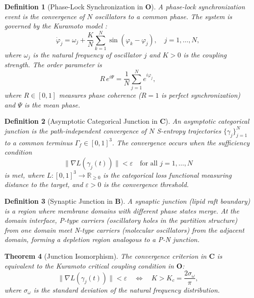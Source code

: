 \documentclass[twocolumn,10pt]{article}
\newtheorem{theorem}{Theorem}[section]
\newtheorem{definition}[theorem]{Definition}
\theoremstyle{remark}
\newcommand{\eps}{\varepsilon}
\newcommand{\CatO}{\mathbf{O}}
\newcommand{\CatC}{\mathbf{C}}
\newcommand{\CatB}{\mathbf{B}}
\begin{document}
\begin{definition}[Phase-Lock Synchronization in $\CatO$]
\label{def:junction_O}
A \emph{phase-lock synchronization event} is the convergence of $N$ oscillators to a common phase.
The system is governed by the Kuramoto model \cite{kuramoto1984,strogatz2000}:
\begin{equation}
\dot{\varphi}_j = \omega_j + \frac{K}{N}\sum_{k=1}^{N}\sin(\varphi_k - \varphi_j), \quad j = 1,\ldots,N,
\label{eq:kuramoto}
\end{equation}
where $\omega_j$ is the natural frequency of oscillator $j$ and $K > 0$ is the coupling strength.
The order parameter is
\begin{equation}
R\, e^{i\Psi} = \frac{1}{N}\sum_{j=1}^{N}e^{i\varphi_j},
\label{eq:order_param}
\end{equation}
where $R \in [0,1]$ measures phase coherence ($R = 1$ is perfect synchronization) and $\Psi$ is the mean phase.
\end{definition}

\begin{definition}[Asymptotic Categorical Junction in $\CatC$]
\label{def:junction_C}
An \emph{asymptotic categorical junction} is the path-independent convergence of $N$ S-entropy trajectories $\{\gamma_j\}_{j=1}^N$ to a common terminus $\Gamma_f \in [0,1]^3$.
The convergence occurs when the sufficiency condition
\begin{equation}
\|\nabla L(\gamma_j(t))\| < \eps \quad \text{for all } j = 1,\ldots,N
\label{eq:sufficiency}
\end{equation}
is met, where $L: [0,1]^3 \to \mathbb{R}_{\geq 0}$ is the categorical loss functional measuring distance to the target, and $\eps > 0$ is the convergence threshold.
\end{definition}

\begin{definition}[Synaptic Junction in $\CatB$]
\label{def:junction_B}
A \emph{synaptic junction} (lipid raft boundary) is a region where membrane domains with different phase states merge.
At the domain interface, P-type carriers (oscillatory holes in the partition structure) from one domain meet N-type carriers (molecular oscillators) from the adjacent domain, forming a depletion region analogous to a P-N junction.
\end{definition}

\begin{theorem}[Junction Isomorphism]
\label{thm:junction_iso}
The convergence criterion in $\CatC$ is equivalent to the Kuramoto critical coupling condition in $\CatO$:
\begin{equation}
\|\nabla L(\gamma_j(t))\| < \eps \quad \Longleftrightarrow \quad K > K_c = \frac{2\sigma_\omega}{\pi},
\label{eq:junction_equivalence}
\end{equation}
where $\sigma_\omega$ is the standard deviation of the natural frequency distribution.
\end{theorem}
\end{document}

